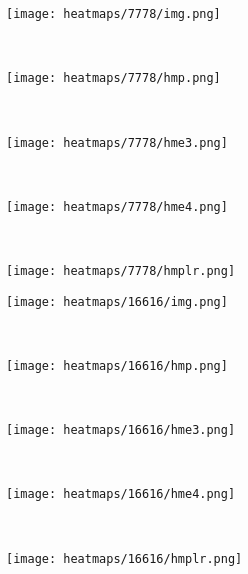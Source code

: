 \documentclass[final]{cvpr}
\begin{document}
\begin{figure}[htbp]
    \centering
    
    
        \begin{subfigure}[t]{0.15\linewidth} \centering \texttt{[image: heatmaps/7778/img.png]}
    \end{subfigure}
   ~
    \begin{subfigure}[t]{0.15\linewidth} \centering \texttt{[image: heatmaps/7778/hmp.png]}
    \end{subfigure}
   ~
        \begin{subfigure}[t]{0.15\linewidth} \centering \texttt{[image: heatmaps/7778/hme3.png]}
    \end{subfigure}
   ~
          \begin{subfigure}[t]{0.15\linewidth} \centering \texttt{[image: heatmaps/7778/hme4.png]}
    \end{subfigure}
   ~
             \begin{subfigure}[t]{0.15\linewidth} \centering \texttt{[image: heatmaps/7778/hmplr.png]}
    \end{subfigure}
    
    \begin{subfigure}[t]{0.15\linewidth} \centering \texttt{[image: heatmaps/16616/img.png]}
    \end{subfigure}
    ~
    \begin{subfigure}[t]{0.15\linewidth} \centering \texttt{[image: heatmaps/16616/hmp.png]}
    \end{subfigure}
~
        \begin{subfigure}[t]{0.15\linewidth} \centering \texttt{[image: heatmaps/16616/hme3.png]}
    \end{subfigure}
  ~
          \begin{subfigure}[t]{0.15\linewidth} \centering \texttt{[image: heatmaps/16616/hme4.png]}
    \end{subfigure}
    ~
             \begin{subfigure}[t]{0.15\linewidth} \centering \texttt{[image: heatmaps/16616/hmplr.png]}
    \end{subfigure}


\end{figure}
\end{document}
